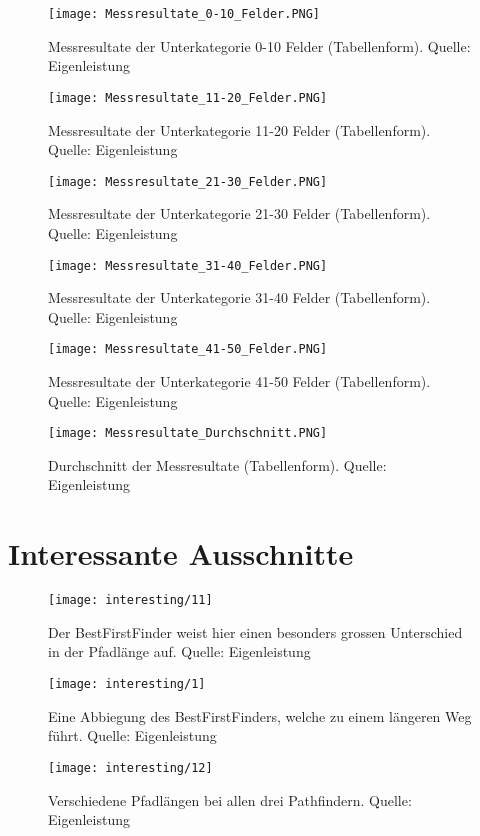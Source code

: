 \begin{figure}[H]
  \centering
  \texttt{[image: Messresultate\_0-10\_Felder.PNG]}
  \caption[Messresultate der Unterkategorie 0-10 Felder (Tabellenform).]{Messresultate der Unterkategorie 0-10 Felder (Tabellenform). Quelle: Eigenleistung}
\end{figure}
\begin{figure}[H]
  \centering
  \texttt{[image: Messresultate\_11-20\_Felder.PNG]}
  \caption[Messresultate der Unterkategorie 11-20 Felder (Tabellenform).]{Messresultate der Unterkategorie 11-20 Felder (Tabellenform). Quelle: Eigenleistung}
\end{figure}
\begin{figure}[H]
  \centering
  \texttt{[image: Messresultate\_21-30\_Felder.PNG]}
  \caption[Messresultate der Unterkategorie 21-30 Felder (Tabellenform).]{Messresultate der Unterkategorie 21-30 Felder (Tabellenform). Quelle: Eigenleistung}
\end{figure}
\begin{figure}[H]
  \centering
  \texttt{[image: Messresultate\_31-40\_Felder.PNG]}
  \caption[Messresultate der Unterkategorie 31-40 Felder (Tabellenform).]{Messresultate der Unterkategorie 31-40 Felder (Tabellenform). Quelle: Eigenleistung}
\end{figure}
\begin{figure}[H]
  \centering
  \texttt{[image: Messresultate\_41-50\_Felder.PNG]}
  \caption[Messresultate der Unterkategorie 41-50 Felder (Tabellenform).]{Messresultate der Unterkategorie 41-50 Felder (Tabellenform). Quelle: Eigenleistung}
\end{figure}
\begin{figure}[H]
  \centering
  \texttt{[image: Messresultate\_Durchschnitt.PNG]}
  \caption[Durchschnitt der Messresultate (Tabellenform).]{Durchschnitt der Messresultate (Tabellenform). Quelle: Eigenleistung}
\end{figure}
\section{Interessante Ausschnitte}
\begin{figure}[H]
  \centering
  \texttt{[image: interesting/11]}
  \caption[Sehr grosser Pfadlängenunterschied des BestFirstFinders.]{Der BestFirstFinder weist hier einen besonders grossen Unterschied in der Pfadlänge auf. Quelle: Eigenleistung}
\end{figure}
\begin{figure}[H]
  \centering
  \texttt{[image: interesting/1]}
  \caption[Eine Abbiegung des BestFirstFinders, welche zu einem längeren Weg führt.]{Eine Abbiegung des BestFirstFinders, welche zu einem längeren Weg führt. Quelle: Eigenleistung}
\end{figure}
\begin{figure}[H]
  \centering
  \texttt{[image: interesting/12]}
  \caption[Ein Resultat, bei dem jeder Pathfinder eine andere Pfadlänge errechnet hat.]{Verschiedene Pfadlängen bei allen drei Pathfindern. Quelle: Eigenleistung}
\end{figure}

